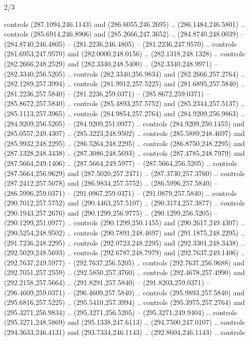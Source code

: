 \begin{flagdescription}{2/3}
\begin{scope}[xshift=0.5\flaglength,yshift=0.5\flagwidth,scale=\flagwidth/235.81]
\begin{scope}[y=0.8pt, x=0.8pt, yscale=-1,shift={(-239.08,-147.38)}]
    controls (287.1094,246.1143) and (286.6055,246.2695) .. (286.1484,246.5801) ..
    controls (285.6914,246.8906) and (285.2666,247.3652) .. (284.8740,248.0039) --
    (284.8740,246.4805) -- (281.2236,246.4805) -- (281.2236,247.9570) .. controls
    (281.6953,247.9570) and (282.0000,248.0156) .. (282.1318,248.1328) .. controls
    (282.2666,248.2529) and (282.3340,248.5400) .. (282.3340,248.9971) --
    (282.3340,256.5205) .. controls (282.3340,256.9834) and (282.2666,257.2764) ..
    (282.1289,257.3994) .. controls (281.9912,257.5225) and (281.6895,257.5840) ..
    (281.2236,257.5840) -- (281.2236,259.0371) -- (285.8672,259.0371) --
    (285.8672,257.5840) .. controls (285.4893,257.5752) and (285.2344,257.5137) ..
    (285.1113,257.3965) .. controls (284.9854,257.2764) and (284.9209,256.9863) ..
    (284.9209,256.5205) -- (284.9209,251.0977) .. controls (284.9209,250.1455) and
    (285.0557,249.4307) .. (285.3223,248.9502) .. controls (285.5889,248.4697) and
    (285.9932,248.2295) .. (286.5264,248.2295) .. controls (286.8750,248.2295) and
    (287.1328,248.3438) .. (287.3086,248.5693) .. controls (287.4785,248.7979) and
    (287.5664,249.1406) .. (287.5664,249.5977) -- (287.5664,256.5205) .. controls
    (287.5664,256.9629) and (287.5020,257.2471) .. (287.3730,257.3760) .. controls
    (287.2412,257.5078) and (286.9834,257.5752) .. (286.5996,257.5840) --
    (286.5996,259.0371) -- (291.0967,259.0371) -- (291.0879,257.5840) .. controls
    (290.7012,257.5752) and (290.4463,257.5107) .. (290.3174,257.3877) .. controls
    (290.1943,257.2676) and (290.1299,256.9775) .. (290.1299,256.5205) --
    (290.1299,251.0977) .. controls (290.1299,250.1455) and (290.2617,249.4307) ..
    (290.5254,248.9502) .. controls (290.7891,248.4697) and (291.1875,248.2295) ..
    (291.7236,248.2295) .. controls (292.0723,248.2295) and (292.3301,248.3438) ..
    (292.5029,248.5693) .. controls (292.6787,248.7979) and (292.7637,249.1406) ..
    (292.7637,249.5977) -- (292.7637,256.5205) .. controls (292.7637,256.9688) and
    (292.7051,257.2559) .. (292.5850,257.3760) .. controls (292.4678,257.4990) and
    (292.2158,257.5664) .. (291.8291,257.5840) -- (291.8203,259.0371) --
    (296.4609,259.0371) -- (296.4609,257.5840) .. controls (295.9893,257.5840) and
    (295.6816,257.5225) .. (295.5410,257.3994) .. controls (295.3975,257.2764) and
    (295.3271,256.9834) .. (295.3271,256.5205) -- (295.3271,249.9404) .. controls
    (295.3271,248.5869) and (295.1338,247.6113) .. (294.7500,247.0107) .. controls
    (294.3633,246.4131) and (293.7334,246.1143) .. (292.8604,246.1143) .. controls

\end{scope}
\end{scope}
\end{flagdescription}
